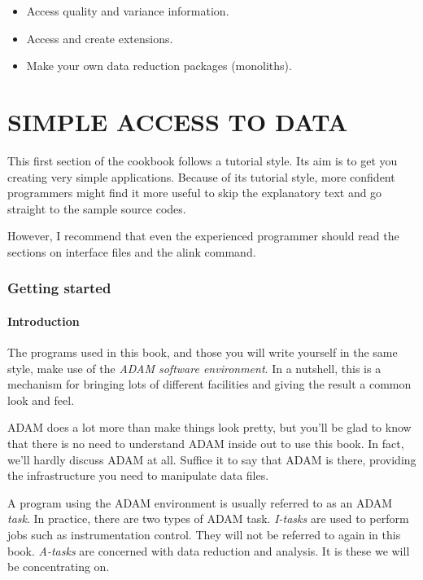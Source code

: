 \begin{itemize}
\item Access quality and variance information.
\item Access and create extensions.
\item Make your own data reduction packages (monoliths).
\end{itemize}

\newpage

\part{SIMPLE ACCESS TO DATA}

\markright{\stardocname}

This first section of the cookbook follows a tutorial style. Its aim is
to get you creating very simple applications. Because of its tutorial
style, more confident programmers might find it more useful to skip the
explanatory text and go straight to the sample source codes.  

However, I recommend that even the experienced programmer should read the
sections on {\sf interface files} and the {\sf alink} command. 

\newpage

\section{Getting started}

\subsection{Introduction}

The programs used in this book, and those you will write yourself in the
same style, make use of the {\it ADAM software environment}.  In a
nutshell, this is a mechanism for bringing  lots of different
facilities and giving the result a common look and feel. 

ADAM does a lot more than make things look pretty, but you'll be glad to
know that there is no need to understand ADAM inside out to use this book.
In fact, we'll hardly discuss ADAM at all. Suffice it to say that ADAM is
there, providing the infrastructure you need to manipulate data files. 

       A program using the ADAM environment is usually referred
       to as an ADAM {\it task}. In practice, there are two types
       of ADAM task. {\it I-tasks} are used to perform jobs such
       as instrumentation control. They will not be referred to again in
       this book. {\it A-tasks} are concerned with data reduction and 
       analysis. It is these we will be concentrating on.

